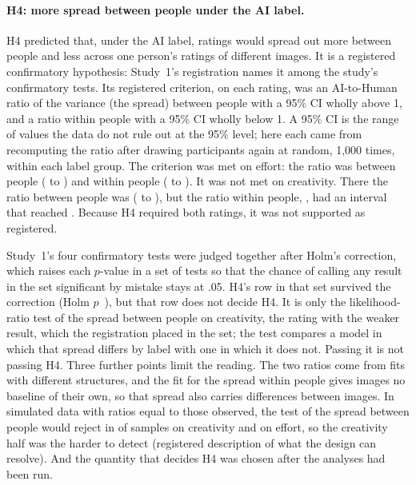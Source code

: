 \paragraph*{H4: more spread between people under the AI label.}
H4 predicted that, under the AI label, ratings would spread out more between people and less across one person's ratings of different images. It is a registered confirmatory hypothesis: Study~1's registration names it among the study's confirmatory tests. Its registered criterion, on each rating, was an AI-to-Human ratio of the variance (the spread) between people with a 95\% CI wholly above 1, and a ratio within people with a 95\% CI wholly below 1. A 95\% CI is the range of values the data do not rule out at the 95\% level; here each came from recomputing the ratio after drawing participants again at random, 1,000 times, within each label group. The criterion was met on effort: the ratio was \SOneHFourEffRatioBetween{} between people (\SOneHFourEffRatioBetweenLo{} to \SOneHFourEffRatioBetweenHi) and \SOneHFourEffRatioResidual{} within people (\SOneHFourEffRatioResidualLo{} to \SOneHFourEffRatioResidualHi). It was not met on creativity. There the ratio between people was \SOneHFourCreatRatioBetween{} (\SOneHFourCreatRatioBetweenLo{} to \SOneHFourCreatRatioBetweenHi), but the ratio within people, \SOneHFourCreatRatioResidual, had an interval that reached \SOneHFourCreatRatioResidualHi. Because H4 required both ratings, it was not supported as registered.

Study~1's four confirmatory tests were judged together after Holm's correction,\cite{holm1979simple} which raises each $p$-value in a set of tests so that the chance of calling any result in the set significant by mistake stays at .05. H4's row in that set survived the correction (Holm $p$~\SOneHFourPHolm), but that row does not decide H4. It is only the likelihood-ratio test of the spread between people on creativity, the rating with the weaker result, which the registration placed in the set; the test compares a model in which that spread differs by label with one in which it does not. Passing it is not passing H4. Three further points limit the reading. The two ratios come from fits with different structures, and the fit for the spread within people gives images no baseline of their own, so that spread also carries differences between images. In simulated data with ratios equal to those observed, the test of the spread between people would reject in \SOneHFourCreatResolutionPowerPct{} of samples on creativity and \SOneHFourEffResolutionPowerPct{} on effort, so the creativity half was the harder to detect (registered description of what the design can resolve). And the quantity that decides H4 was chosen after the analyses had been run.

